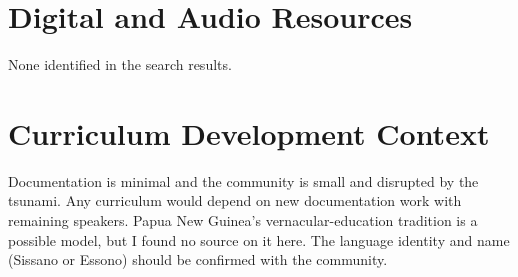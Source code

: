 \documentclass[12pt]{article}
\begin{document}
\section{Digital and Audio Resources}
None identified in the search results.

\section{Curriculum Development Context}
Documentation is minimal and the community is small and disrupted by the tsunami. Any curriculum would depend on new documentation work with remaining speakers. Papua New Guinea's vernacular-education tradition is a possible model, but I found no source on it here. The language identity and name (Sissano or Essono) should be confirmed with the community.
\end{document}
